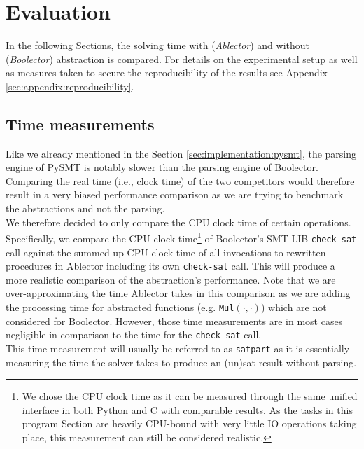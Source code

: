 \chapter{Evaluation}
\label{ch:evaluation}
In the following Sections, the solving time with (\textit{Ablector}) and without (\textit{Boolector}) abstraction is compared.
For details on the experimental setup as well as measures taken to secure the reproducibility of the results see Appendix \ref{sec:appendix:reproducibility}.

\section{Time measurements}
Like we already mentioned in the Section \ref{sec:implementation:pysmt}, the parsing engine of PySMT is notably slower than the parsing engine of Boolector.
Comparing the real time (i.e., clock time) of the two competitors would therefore result in a very biased performance comparison as we are trying
to benchmark the abstractions and not the parsing.\\
We therefore decided to only compare the CPU clock time of certain operations.
Specifically, we compare the CPU clock time\footnote{We chose the CPU clock time as it can be measured through the same unified interface in both Python and C with comparable results. As the tasks in this program Section are heavily CPU-bound with very little IO operations taking place, this measurement can still be considered realistic.} of Boolector's SMT-LIB \texttt{check-sat} call
against the summed up CPU clock time of all invocations to rewritten procedures in Ablector including its own \texttt{check-sat} call.
This will produce a more realistic comparison of the abstraction's performance.
Note that we are over-approximating the time Ablector takes in this comparison as we are
adding the processing time for abstracted functions (e.g. \texttt{Mul$\left(\cdot,\cdot\right)$}) which are not considered for Boolector.
However, those time measurements are in most cases negligible in comparison to the time for the \texttt{check-sat} call.\\
This time measurement will usually be referred to as \texttt{satpart} as it is essentially measuring the time the solver takes to produce an (un)sat result without parsing.


